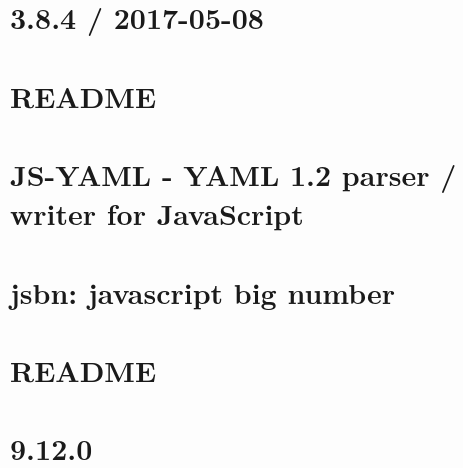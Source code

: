 \documentclass[twoside]{book}
\newcommand{\+}{\discretionary{\mbox{\scriptsize$\hookleftarrow$}}{}{}}
\begin{document}
\chapter{3.8.4 / 2017-\/05-\/08}
\label{md__c_1_workspace_demo_src_main_script_node_modules_js-yaml__c_h_a_n_g_e_l_o_g}

\chapter{R\+E\+A\+D\+ME}
\label{md__c_1_workspace_demo_src_main_script_node_modules_js-yaml_node_modules_esprima__r_e_a_d_m_e}

\chapter{J\+S-\/\+Y\+A\+ML -\/ Y\+A\+ML 1.2 parser / writer for Java\+Script}
\label{md__c_1_workspace_demo_src_main_script_node_modules_js-yaml__r_e_a_d_m_e}

\chapter{jsbn\+: javascript big number}
\label{md__c_1_workspace_demo_src_main_script_node_modules_jsbn__r_e_a_d_m_e}

\chapter{R\+E\+A\+D\+ME}
\label{md__c_1_workspace_demo_src_main_script_node_modules_jschardet__r_e_a_d_m_e}

\chapter{9.12.0}
\label{md__c_1_workspace_demo_src_main_script_node_modules_jsdom__changelog}

\end{document}
